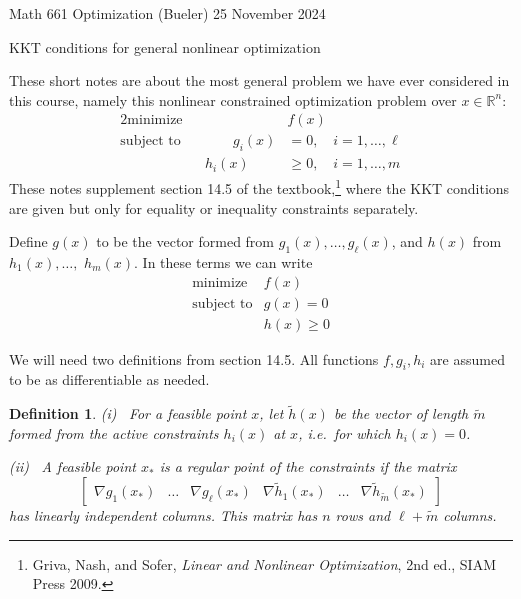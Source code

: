 \documentclass[12pt]{amsart}
\newtheorem*{defn}{Definition}
\theoremstyle{definition}
\newcommand{\RR}{\mathbb{R}}
\newcommand{\grad}{\nabla}
\begin{document}
\scriptsize \noindent Math 661 Optimization (Bueler) \hfill 25 November 2024
\normalsize

\medskip\bigskip
\Large
\centerline{KKT conditions for general nonlinear optimization}

\bigskip\medskip
\normalsize

\thispagestyle{empty}

These short notes are about the most general problem we have ever considered in this course, namely this nonlinear constrained optimization problem over $x\in\RR^n$:
\begin{alignat*}{2}
    \text{minimize}   &&  &f(x) \\
    \text{subject to} && \qquad g_i(x) &= 0, \quad i=1,\dots,\ell \\
                      &&       h_i(x) &\ge 0, \quad i=1,\dots,m
\end{alignat*}
These notes supplement section 14.5 of the textbook,\footnote{Griva, Nash, and Sofer, \emph{Linear and Nonlinear Optimization}, 2nd ed., SIAM Press 2009.} where the KKT conditions are given but only for equality or inequality constraints separately.

Define $g(x)$ to be the vector formed from $g_1(x),\dots,g_\ell(x)$, and $h(x)$ from $h_1(x),\dots,$ $h_m(x)$.  In these terms we can write
\begin{equation}
\begin{matrix}
    \text{minimize}   & f(x) \\
    \text{subject to} & g(x) = 0 \\
                      & h(x) \ge 0
\end{matrix} \label{prob}
\end{equation}

We will need two definitions from section 14.5.  All functions $f,g_i,h_i$ are assumed to be as differentiable as needed.

\begin{defn}  \emph{(i)} \, For a feasible point $x$, let $\tilde h(x)$ be the vector of length $\tilde m$ formed from the \emph{active} constraints $h_i(x)$ at $x$, i.e.~for which $h_i(x)=0$.

\smallskip
\noindent \emph{(ii)} \, A feasible point $x_*$ is a \emph{regular point} of the constraints if the matrix
    $$\begin{bmatrix}
    \grad g_1(x_*) & \dots & \grad g_\ell(x_*) & \grad {\tilde h}_1(x_*) & \dots & \grad {\tilde h}_{\tilde m}(x_*)
    \end{bmatrix}$$
has linearly independent columns.  This matrix has $n$ rows and $\ell + \tilde m$ columns. \end{defn}
\end{document}
